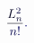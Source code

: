 \documentclass[12pt]{article}
\begin{document}
\makeatletter
\renewcommand*{\@textcolor}[3]{%
  \protect\leavevmode
  \begingroup
    \color#1{#2}#3%
  \endgroup
}
\makeatother
\begin{displaymath}
\mathcolor[RGB]{0,0,15}{\frac { \mathcolor[RGB]{0,0,30}{L} _ { \mathcolor[RGB]{0,0,45}{n} } ^ { \mathcolor[RGB]{0,0,60}{2} } } { \mathcolor[RGB]{0,0,75}{n} \mathcolor[RGB]{0,0,90}{!} } } \mathcolor[RGB]{0,0,105}{.}
\end{displaymath}
\end{document}
